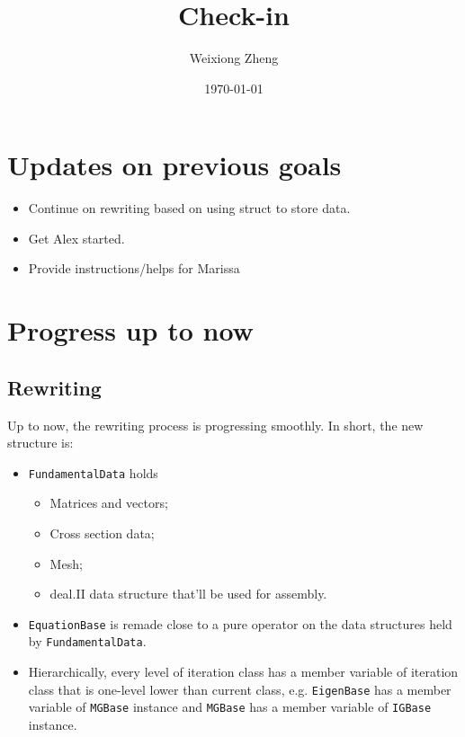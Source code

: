 \documentclass{article}
\title{Check-in} %
\author{Weixiong Zheng} %
\date{\today} %
\begin{document}
\maketitle %

\section{Updates on previous goals}
\begin{itemize}
	\item Continue on rewriting based on using struct to store data.
	\item Get Alex started.
	\item Provide instructions/helps for Marissa
\end{itemize}
\section{Progress up to now}
\subsection{Rewriting}
Up to now, the rewriting process is progressing smoothly. In short, the new structure is:
\begin{itemize}
	\item {\tt FundamentalData} holds 
	\begin{itemize}
		\item Matrices and vectors;
		\item Cross section data;
		\item Mesh;
		\item deal.II data structure that'll be used for assembly.
	\end{itemize}
	\item {\tt EquationBase} is remade close to a pure operator on the data structures held by {\tt FundamentalData}.
	\item Hierarchically, every level of iteration class has a member variable of iteration class that is one-level lower than current class, e.g. {\tt EigenBase} has a member variable of {\tt MGBase} instance and {\tt MGBase} has a member variable of {\tt IGBase} instance.
\end{itemize}
\end{document}
